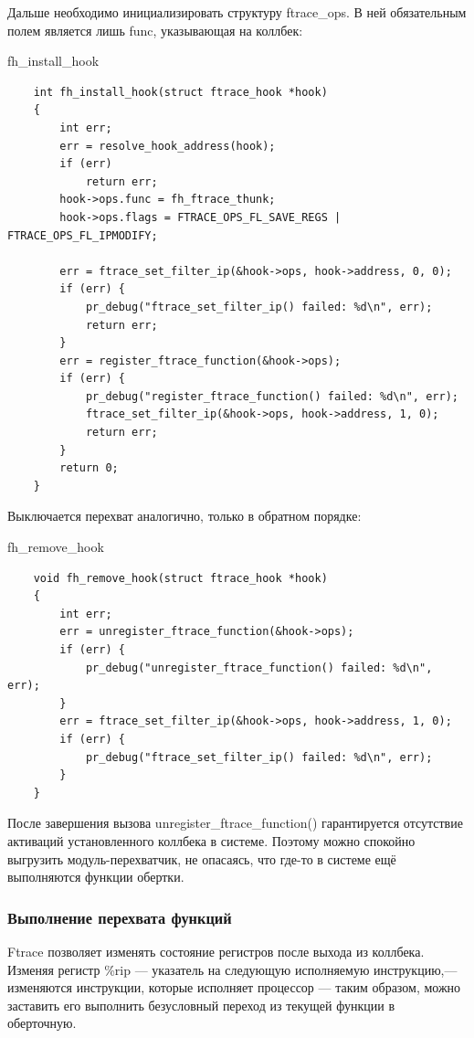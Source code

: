 \documentclass[a4paper,14pt]{extarticle}
\begin{document}
\newpage

Дальше необходимо инициализировать структуру ftrace\_ops. В ней обязательным полем является лишь func, указывающая на коллбек:

\begin{listing}[h]
	\caption{fh\_install\_hook}
	\begin{verbatim}
	int fh_install_hook(struct ftrace_hook *hook)
	{	
		int err;
		err = resolve_hook_address(hook);
		if (err)
			return err;
		hook->ops.func = fh_ftrace_thunk;
		hook->ops.flags = FTRACE_OPS_FL_SAVE_REGS | FTRACE_OPS_FL_IPMODIFY;
		
		err = ftrace_set_filter_ip(&hook->ops, hook->address, 0, 0);
		if (err) {
			pr_debug("ftrace_set_filter_ip() failed: %d\n", err);
			return err;
		}
		err = register_ftrace_function(&hook->ops);
		if (err) {
			pr_debug("register_ftrace_function() failed: %d\n", err);
			ftrace_set_filter_ip(&hook->ops, hook->address, 1, 0);
			return err;
		}
		return 0;
	}
	\end{verbatim}
\end{listing}

Выключается перехват аналогично, только в обратном порядке:

\begin{listing}[h]
	\caption{fh\_remove\_hook}
	\begin{verbatim}
	void fh_remove_hook(struct ftrace_hook *hook)
	{
		int err;
		err = unregister_ftrace_function(&hook->ops);
		if (err) {
			pr_debug("unregister_ftrace_function() failed: %d\n", err);
		}
		err = ftrace_set_filter_ip(&hook->ops, hook->address, 1, 0);
		if (err) {
			pr_debug("ftrace_set_filter_ip() failed: %d\n", err);
		}
	}
	\end{verbatim}
\end{listing}

После завершения вызова unregister\_ftrace\_function() гарантируется отсутствие активаций установленного коллбека в системе. Поэтому можно спокойно выгрузить модуль-перехватчик, не опасаясь, что где-то в системе ещё выполняются функции обертки.

\subsubsection{Выполнение перехвата функций}

Ftrace позволяет изменять состояние регистров после выхода из коллбека. Изменяя регистр \%rip — указатель на следующую исполняемую инструкцию,— изменяются инструкции, которые исполняет процессор — таким образом, можно заставить его выполнить безусловный переход из текущей функции в оберточную.
\end{document}
